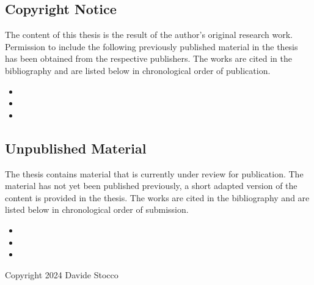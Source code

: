 \documentclass[a4paper, 11pt, openright]{book} %
\date{January 2024}
\makeatletter
\newcommand*{\emptystyles}{%
\let\oldplain\ps@plain
\let\ps@plain\ps@empty
\pagestyle{empty}}
\let\ps@plain\ps@empty%
\makeatother
\begin{document}
\emptystyles

\hbox{}
\thispagestyle{empty}
\newpage

\subsection*{Copyright Notice}
%
The content of this thesis is the result of the author's original research work. Permission to include the following previously published material in the thesis has been obtained from the respective publishers. The works are cited in the bibliography and are listed below in chronological order of publication.
%
\begin{itemize}
  \item {}
  \item {}
  \item {}
\end{itemize}

\subsection*{Unpublished Material}
%
The thesis contains material that is currently under review for publication. The material has not yet been published previously, a short adapted version of the content is provided in the thesis. The works are cited in the bibliography and are listed below in chronological order of submission.
%
\begin{itemize}
  \item {}
  \item {}
  \item {}
\end{itemize}

\vspace*{\fill}

\begin{center}
  Copyright \textcopyright{} 2024 Davide Stocco \\
\end{center}
\thispagestyle{empty}
\cleardoublepage


\vspace*{\fill}
\end{document}
